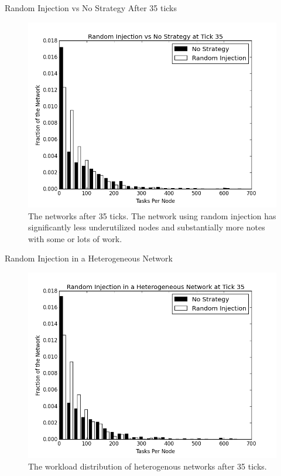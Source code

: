 \documentclass[11pt]{beamer}
\begin{document}

\begin{frame}{Random Injection vs No Strategy After 35 ticks}
\begin{figure}
	\centering
	\includegraphics[width=0.7\linewidth]{figs/randomStableHist35}
	\caption[Random injection vs no strategy after 35 ticks.]{The networks after 35 ticks.  The network using random injection has significantly less underutilized nodes and substantially more notes with some or lots of work.}
	\label{fig:randomStableHist35}
\end{figure}
\end{frame}



\begin{frame}{Random Injection in a Heterogeneous Network}
\begin{figure}
	\centering
	\includegraphics[width=0.7\linewidth]{figs/randomStableHistHetero35}
	\caption[Random injection in a Heterogenous Network]{The workload distribution of heterogenous networks after 35 ticks.  }
	\label{fig:randomStableHistHetero35}
\end{figure}
\end{frame}
\end{document}
